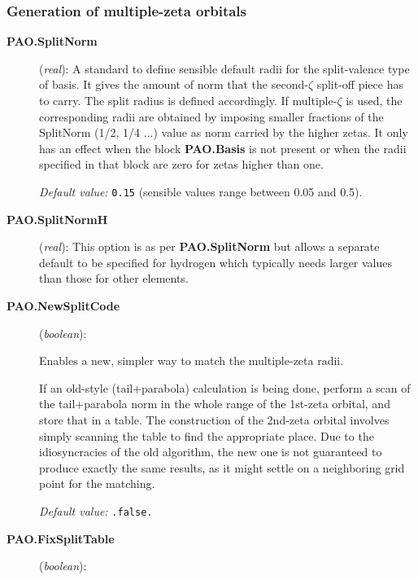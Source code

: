 \subsubsection{Generation of multiple-zeta orbitals}
\begin{description}

\item[\textbf{PAO.SplitNorm}] (\textit{real}):
A standard to define sensible default
radii for the split-valence type of basis. It gives the amount of norm that
the second-$\zeta$ split-off piece has to carry. The split radius is defined
accordingly. If multiple-$\zeta$
is used, the corresponding radii are obtained
by imposing smaller fractions of the SplitNorm (1/2, 1/4 ...) value as
norm carried by the higher zetas. It only has an effect when the block
\textbf{PAO.Basis} is not present or when the radii
specified in that block are zero for zetas higher than one.

\textit{Default value:} \texttt{0.15} (sensible values range between 0.05 and 0.5).

\item[\textbf{PAO.SplitNormH}] (\textit{real}):
This option is as per \textbf{PAO.SplitNorm} but allows a separate
default to be
specified for hydrogen which typically needs larger values than those
for other
elements.

\item[\textbf{PAO.NewSplitCode}] (\textit{boolean}):

Enables a new, simpler way to match the multiple-zeta radii.

If an old-style (tail+parabola) calculation is being done, perform a
scan of the tail+parabola norm in the whole range of the 1st-zeta
orbital, and store that in a table. The construction of the
2nd-zeta orbital involves simply scanning the table to find the
appropriate place. Due to the idiosyncracies of the old algorithm,
the new one is not guaranteed to produce exactly the same results,
as it might settle on a neighboring grid point for the matching.

\textit{Default value:} \texttt{.false.}

\item[\textbf{PAO.FixSplitTable}] (\textit{boolean}):


\end{description}
